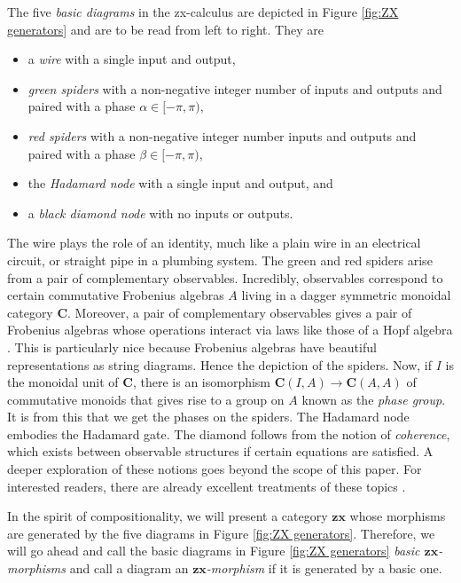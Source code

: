\documentclass[11pt]{amsart}
\theoremstyle{definition}
\begin{document}
The five \emph{basic diagrams} in the zx-calculus are depicted in Figure \ref{fig:ZX generators} and are to be read from left to right. They are
\begin{itemize}
	\item a \emph{wire} with a single input and output,
	\item \emph{green spiders} with a non-negative integer number of inputs and outputs and paired with a phase $\alpha \in [-\pi,\pi)$,
	\item \emph{red spiders} with a non-negative integer number inputs and outputs and paired with a phase $\beta \in [-\pi,\pi)$,
	\item the \emph{Hadamard node} with a single input and output, and
	\item a \emph{black diamond node} with no inputs or outputs.
\end{itemize}
The wire plays the role of an identity, much like a plain wire in an electrical circuit, or straight pipe in a plumbing system. The green and red spiders arise from a pair of complementary observables.  Incredibly, observables correspond to certain commutative Frobenius algebras $A$ living in a dagger symmetric monoidal category $\mathbf{C}$. Moreover, a pair of complementary observables gives a pair of Frobenius algebras whose operations interact via laws like those of a Hopf algebra \cite{CoeckePavlovic_QuantumMeasSums, CoeckePavVicary_OrthBasis}.  This is particularly nice because Frobenius algebras have beautiful representations as string diagrams. Hence the depiction of the spiders. Now, if $I$ is the monoidal unit of $\mathbf{C}$, there is an isomorphism $\mathbf{C}(I,A) \to \mathbf{C}(A,A)$ of commutative monoids that gives rise to a group on $A$ known as the \emph{phase group}.  It is from this that we get the phases on the spiders. The Hadamard node embodies the Hadamard gate. The diamond follows from the notion of \emph{coherence}, which exists between observable structures if certain equations are satisfied.  A deeper exploration of these notions goes beyond the scope of this paper.  For interested readers, there are already excellent treatments of these topics \cite{CoeckeDuncan_QuantumObsFullPaper}.

In the spirit of compositionality, we will present a category $\mathbf{zx}$ whose morphisms are generated by the five diagrams in Figure \ref{fig:ZX generators}. Therefore, we will go ahead and call the basic diagrams in Figure \ref{fig:ZX generators} \emph{basic $\mathbf{zx}$-morphisms} and call a diagram an \emph{$\mathbf{zx}$-morphism} if it is generated by a basic one.
\end{document}

